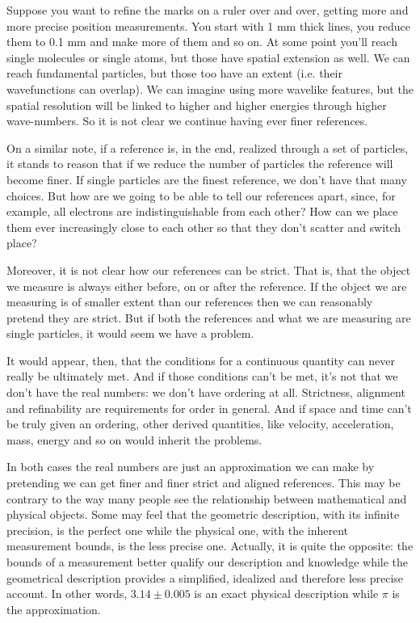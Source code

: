 Suppose you want to refine the marks on a ruler over and over, getting more and more precise position measurements. You start with 1 mm thick lines, you reduce them to 0.1 mm and make more of them and so on. At some point you'll reach single molecules or single atoms, but those have spatial extension as well. We can reach fundamental particles, but those too have an extent (i.e. their wavefunctions can overlap). We can imagine using more wavelike features, but the spatial resolution will be linked to higher and higher energies through higher wave-numbers. So it is not clear we continue having ever finer references.

On a similar note, if a reference is, in the end, realized through a set of particles, it stands to reason that if we reduce the number of particles the reference will become finer. If single particles are the finest reference, we don't have that many choices. But how are we going to be able to tell our references apart, since, for example, all electrons are indistinguishable from each other? How can we place them ever increasingly close to each other so that they don't scatter and switch place?

Moreover, it is not clear how our references can be strict. That is, that the object we measure is always either before, on or after the reference. If the object we are measuring is of smaller extent than our references then we can reasonably pretend they are strict. But if both the references and what we are measuring are single particles, it would seem we have a problem.

It would appear, then, that the conditions for a continuous quantity can never really be ultimately met. And if those conditions can't be met, it's not that we don't have the real numbers: we don't have ordering at all. Strictness, alignment and refinability are requirements for order in general. And if space and time can't be truly given an ordering, other derived quantities, like velocity, acceleration, mass, energy and so on would inherit the problems.

In both cases the real numbers are just an approximation we can make by pretending we can get finer and finer strict and aligned references. This may be contrary to the way many people see the relationship between mathematical and physical objects. Some may feel that the geometric description, with its infinite precision, is the perfect one while the physical one, with the inherent measurement bounds, is the less precise one. Actually, it is quite the opposite: the bounds of a measurement better qualify our description and knowledge while the geometrical description provides a simplified, idealized and therefore less precise account. In other words, $3.14 \pm 0.005$ is an exact physical description while  $\pi$ is the approximation.

